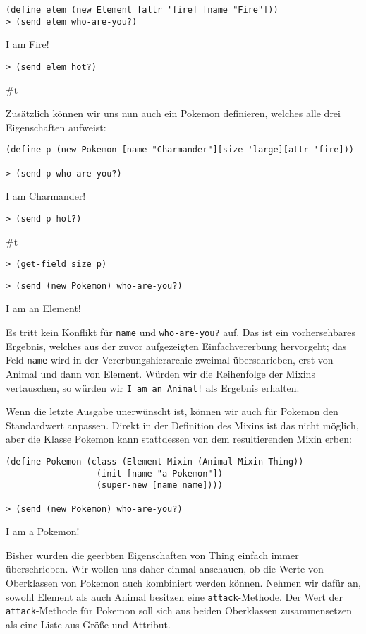 \begin{lstlisting}
(define elem (new Element [attr 'fire] [name "Fire"]))
> (send elem who-are-you?)
\end{lstlisting} 
{\routput {\qq}I am Fire!\qq}

\begin{lstlisting}
> (send elem hot?)
\end{lstlisting} 
{\routput \#t}

Zusätzlich können wir uns nun auch ein Pokemon definieren, welches alle drei Eigenschaften aufweist:
\begin{lstlisting}
(define p (new Pokemon [name "Charmander"][size 'large][attr 'fire]))
 
> (send p who-are-you?)
\end{lstlisting}
{\routput {\qq}I am Charmander!\qq}
\begin{lstlisting}
> (send p hot?)
\end{lstlisting}
{\routput \#t}
\begin{lstlisting}
> (get-field size p)
\end{lstlisting}
{}
\begin{lstlisting}
> (send (new Pokemon) who-are-you?)
\end{lstlisting}
{\routput {\qq}I am an Element!\qq}

Es tritt kein Konflikt für \texttt{name} und \texttt{who-are-you?} auf. Das ist ein vorhersehbares Ergebnis, welches aus der zuvor aufgezeigten Einfachvererbung hervorgeht; das Feld \texttt{name} wird in der Vererbungshierarchie zweimal überschrieben, erst von Animal und dann von Element. Würden wir die Reihenfolge der Mixins vertauschen, so würden wir \texttt{{\qq}I am an Animal!\qq} als Ergebnis erhalten.

Wenn die letzte Ausgabe unerwünscht ist, können wir auch für Pokemon den Standardwert anpassen. Direkt in der Definition des Mixins ist das nicht möglich, aber die Klasse Pokemon kann stattdessen von dem resultierenden Mixin erben:

\begin{lstlisting}
(define Pokemon (class (Element-Mixin (Animal-Mixin Thing))
                  (init [name "a Pokemon"])
                  (super-new [name name])))
     
> (send (new Pokemon) who-are-you?)
\end{lstlisting}
{\routput {\qq}I am a Pokemon!\qq}

Bisher wurden die geerbten Eigenschaften von Thing einfach immer überschrieben. Wir wollen uns daher einmal anschauen, ob die Werte von Oberklassen von Pokemon auch kombiniert werden können. Nehmen wir dafür an, sowohl Element als auch Animal besitzen eine \texttt{attack}-Methode. Der Wert der \texttt{attack}-Methode für Pokemon soll sich aus beiden Oberklassen zusammensetzen als eine Liste aus Größe und Attribut.

